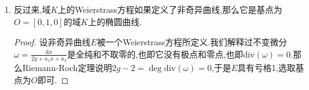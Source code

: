 \begin{enumerate}
\begin{proof}
		我们解释了$\{x,x'\}$在点$O$是二阶极点,$\{y,y'\}$在点$O$是三阶极点.于是$\{1,x\}$和$\{1,x'\}$都是$\mathscr{L}(2(O))$的基,$\{1,x,y\}$和$\{1,x',y'\}$都是$\mathscr{L}(3(O))$的基.于是存在$u_1,u_2\in K^*$和$r,s_2,t\in K$使得$x=u_1x'+r$和$y=u_2y'+s_2x'+t$.因为$(x,y)$和$(x',y')$都满足Weierstrass方程,所以$Y^2$和$X^3$的系数得相同,于是$u_1^3=u_2^2$,取$u=u_1^{1/2}=u_2^{1/3}$和$s=s_2/u^2$,那么有$x=u^2x'+r$和$y=u^3y'+su^2x'+t$.
	\end{proof}
	\item 反过来,域$K$上的Weierstrass方程如果定义了非奇异曲线,那么它是基点为$O=[0,1,0]$的域$K$上的椭圆曲线.
	\begin{proof}
		
		设非奇异曲线$E$被一个Weierstrass方程所定义.我们解释过不变微分$\omega=\frac{\mathrm{d}x}{2y+a_1x+a_3}$是全纯和不取零的,也即它没有极点和零点,也即$\mathrm{div}(\omega)=0$.那么Riemann-Roch定理说明$2g-2=\deg\mathrm{div}(\omega)=0$,于是$E$具有亏格1,选取基点为$O$即可.
	\end{proof}
\end{enumerate}

